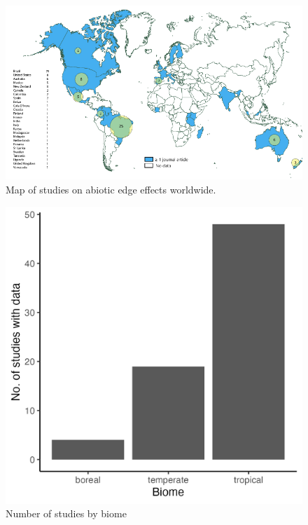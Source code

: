 \documentclass[
  man]{apa6}
\begin{document}
\begin{figure}[H]

{\centering \includegraphics[width=0.95\linewidth,]{images/temp_00017} 

}

\caption{Map of studies on abiotic edge effects worldwide.}\label{fig:map}
\end{figure}

\begin{figure}[H]

{\centering \includegraphics[width=0.8\linewidth,]{images/biome_hist_eb} 

}

\caption{Number of studies by biome}\label{fig:hist-biome}
\end{figure}
\end{document}
